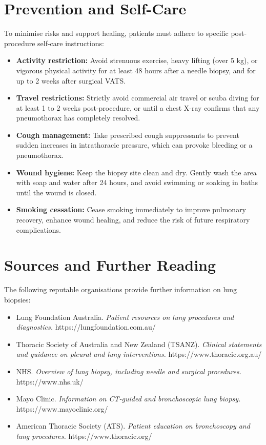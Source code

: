 \section*{Prevention and Self-Care}
To minimise risks and support healing, patients must adhere to specific post-procedure self-care instructions:
\begin{itemize}
    \item \textbf{Activity restriction:} Avoid strenuous exercise, heavy lifting (over 5 kg), or vigorous physical activity for at least 48 hours after a needle biopsy, and for up to 2 weeks after surgical VATS.
    \item \textbf{Travel restrictions:} Strictly avoid commercial air travel or scuba diving for at least 1 to 2 weeks post-procedure, or until a chest X-ray confirms that any pneumothorax has completely resolved.
    \item \textbf{Cough management:} Take prescribed cough suppressants to prevent sudden increases in intrathoracic pressure, which can provoke bleeding or a pneumothorax.
    \item \textbf{Wound hygiene:} Keep the biopsy site clean and dry. Gently wash the area with soap and water after 24 hours, and avoid swimming or soaking in baths until the wound is closed.
    \item \textbf{Smoking cessation:} Cease smoking immediately to improve pulmonary recovery, enhance wound healing, and reduce the risk of future respiratory complications.
\end{itemize}

\section*{Sources and Further Reading}
The following reputable organisations provide further information on lung biopsies:
\begin{itemize}
    \item Lung Foundation Australia. \textit{Patient resources on lung procedures and diagnostics.} https://lungfoundation.com.au/
    \item Thoracic Society of Australia and New Zealand (TSANZ). \textit{Clinical statements and guidance on pleural and lung interventions.} https://www.thoracic.org.au/
    \item NHS. \textit{Overview of lung biopsy, including needle and surgical procedures.} https://www.nhs.uk/
    \item Mayo Clinic. \textit{Information on CT-guided and bronchoscopic lung biopsy.} https://www.mayoclinic.org/
    \item American Thoracic Society (ATS). \textit{Patient education on bronchoscopy and lung procedures.} https://www.thoracic.org/
\end{itemize}
